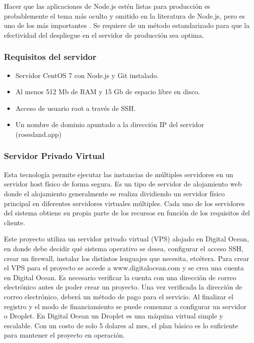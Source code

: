 Hacer que las aplicaciones de Node.js estén listas para producción es probablemente el tema más oculto y omitido en la literatura de Node.js, pero es uno de los más importantes \cite{mardan}. Se requiere de un método estandarizado para que la efectividad del despliegue en el servidor de producción sea optima.

\subsubsection{Requisitos del servidor}

\begin{itemize}
  \item Servidor CentOS 7 con Node.js y Git instalado.
  \item Al menos 512 Mb de RAM y 15 Gb de espacio libre en disco.
  \item Acceso de usuario root a través de SSH.
  \item Un nombre de dominio apuntado a la dirección IP del servidor (rosesland.app)
  
\end{itemize}

\subsubsection{Servidor Privado Virtual}
Esta tecnología permite ejecutar las instancias de múltiples servidores en un servidor host físico de forma segura. Es un tipo de servidor de alojamiento web donde el alojamiento generalmente se realiza dividiendo un servidor físico principal en diferentes servidores virtuales múltiples. Cada uno de los servidores del sistema obtiene su propia parte de los recursos en función de los requisitos del cliente.
\vspace{0.8cm}

Este proyecto utiliza un servidor privado virtual (VPS) alojado en Digital Ocean, en donde debe decidir qué sistema operativo se desea, configurar el acceso SSH, crear un firewall, instalar los distintos lenguajes que necesita, etcétera. Para crear el VPS para el proyecto se accede a www.digitalocean.com y se crea una cuenta en Digital Ocean. Es necesario verificar la cuenta con una dirección de correo electrónico antes de poder crear un proyecto. Una vez verificada la dirección de correo electrónico, deberá un método de pago para el servicio. Al finalizar el registro y el modo de financiamiento se puede comenzar a configurar un servidor o Droplet. En Digital Ocean un Droplet es una máquina virtual simple y escalable. Con un costo de solo 5 dolares al mes, el plan básico es lo suficiente para mantener el proyecto en operación.
\vspace{0.8cm}

